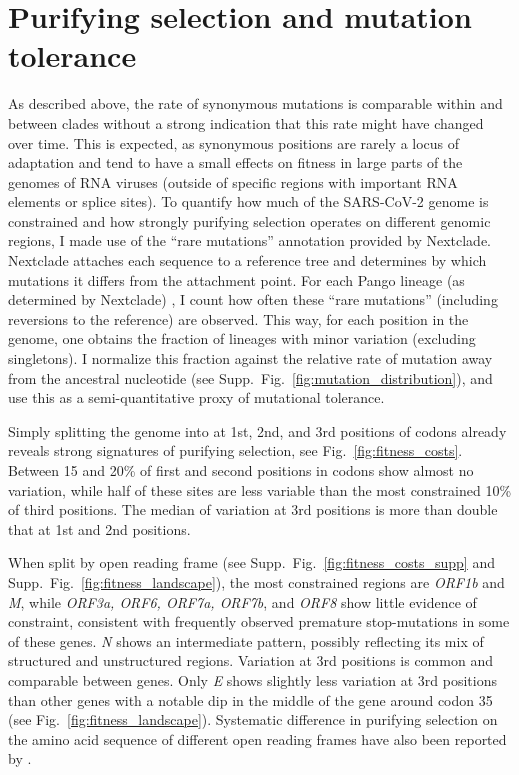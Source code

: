 \documentclass[aps,rmp, twocolumn]{revtex4}
\begin{document}
\section*{Purifying selection and mutation tolerance}

As described above, the rate of synonymous mutations is comparable within and between clades without a strong indication that this rate might have changed over time.
This is expected, as synonymous positions are rarely a locus of adaptation and tend to have a small effects on fitness in large parts of the genomes of RNA viruses \citep{zanini_vivo_2017} (outside of specific regions with important RNA elements or splice sites).
To quantify how much of the SARS-CoV-2 genome is constrained and how strongly purifying selection operates on different genomic regions, I made use of the ``rare mutations'' annotation provided by Nextclade.
Nextclade attaches each sequence to a reference tree and determines by which mutations it differs from the attachment point.
For each Pango lineage (as determined by Nextclade) \citep{rambaut_dynamic_2020,aksamentov_nextclade_2021}, I count how often these ``rare mutations'' (including reversions to the reference) are observed.
This way, for each position in the genome, one obtains the fraction of lineages with minor variation (excluding singletons).
I normalize this fraction against the relative rate of mutation away from the ancestral nucleotide (see Supp.~Fig.~\ref{fig:mutation_distribution}), and use this as a semi-quantitative proxy of mutational tolerance.

Simply splitting the genome into at 1st, 2nd, and 3rd positions of codons already reveals strong signatures of purifying selection, see Fig.~\ref{fig:fitness_costs}.
Between 15 and 20\% of first and second positions in codons show almost no variation, while half of these sites are less variable than the most constrained 10\% of third positions.
The median of variation at 3rd positions is more than double that at 1st and 2nd positions.

When split by open reading frame (see Supp.~Fig.~\ref{fig:fitness_costs_supp} and Supp.~Fig.~\ref{fig:fitness_landscape}), the most constrained regions are \emph{ORF1b} and \emph{M}, while \emph{ORF3a, ORF6, ORF7a, ORF7b}, and \emph{ORF8} show little evidence of constraint, consistent with frequently observed premature stop-mutations in some of these genes.
\emph{N} shows an intermediate pattern, possibly reflecting its mix of structured and unstructured regions.
Variation at 3rd positions is common and comparable between genes.
Only \emph{E} shows slightly less variation at 3rd positions than other genes with a notable dip in the middle of the gene around codon 35 (see Fig.~\ref{fig:fitness_landscape}).
Systematic difference in purifying selection on the amino acid sequence of different open reading frames have also been reported by \citet{rochman_ongoing_2021}.
\end{document}
